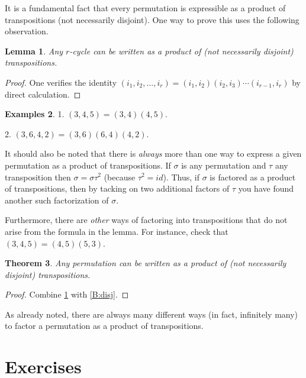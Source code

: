 \documentclass[11pt]{article}
\newtheorem{thm}{Theorem}[section]
\newtheorem{lem}[thm]{Lemma}
\theoremstyle{definition}
\newtheorem{examples}[thm]{Examples}
\begin{document}
It is a fundamental fact that every permutation is expressible as a
product of transpositions (not necessarily disjoint). One way to prove
this uses the following observation.

\begin{lem}\label{B:trans} 
  Any $r$-cycle can be written as a product of (not necessarily
  disjoint) transpositions.
\end{lem}

\begin{proof} 
One verifies the identity $(i_1, i_2, \dots, i_r) = (i_1,i_2)(i_2,i_3)
\cdots (i_{r-1},i_r)$ by direct calculation.
\end{proof}

\begin{examples}
1. $(3,4,5) = (3,4)(4,5)$.

2. $(3,6,4,2) = (3,6)(6,4)(4,2)$.  
\end{examples}

It should also be noted that there is \emph{always} more than one way
to express a given permutation as a product of transpositions. If
$\sigma$ is any permutation and $\tau$ any transposition then $\sigma
= \sigma\tau^2$ (because $\tau^2 = id$). Thus, if $\sigma$ is factored
as a product of transpositions, then by tacking on two additional
factors of $\tau$ you have found another such factorization of
$\sigma$.

Furthermore, there are \emph{other} ways of factoring into
transpositions that do not arise from the formula in the lemma. For
instance, check that $(3,4,5) = (4,5)(5,3)$.

\begin{thm} \label{B:transpositionthm} 
Any permutation can be written as a product of (not necessarily
disjoint) transpositions.
\end{thm}

\begin{proof}
Combine \ref{B:trans} with \ref{B:disj}.
\end{proof}

As already noted, there are always many different ways (in fact,
infinitely many) to factor a permutation as a product of
transpositions.



\section*{Exercises}
\end{document}
